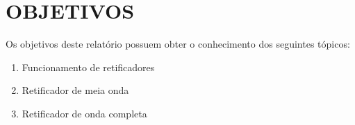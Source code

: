 \chapter{OBJETIVOS}

Os objetivos deste relatório possuem obter o conhecimento dos seguintes tópicos:

\begin{enumerate}
    \item Funcionamento de retificadores
    \item Retificador de meia onda
    \item Retificador de onda completa
\end{enumerate}